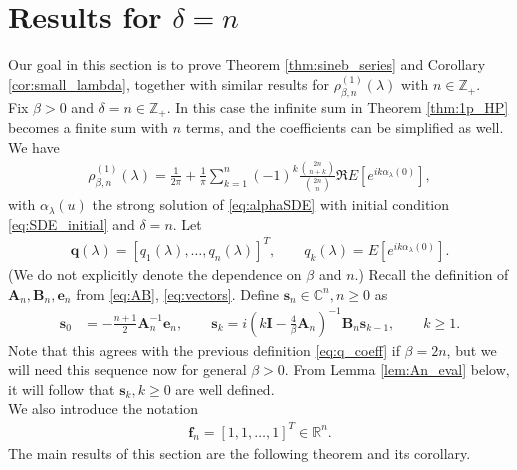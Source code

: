 \documentclass[12pt]{article}
\theoremstyle{definition} %
\newcommand{\Z}{{\mathbb Z}}
\newcommand{\R}{{\mathbb R}}
\newcommand{\CC}{{\mathbb C}}
\theoremstyle{remark} %
\begin{document}
\section{Results for $\delta=n$}\label{sec:delta_n}

Our goal in this section is to prove Theorem \ref{thm:sineb_series} and  Corollary \ref{cor:small_lambda}, together with  similar results for $\rho_{\beta,n}^{(1)}(\lambda)$ with $n\in \Z_+$.\\
Fix $\beta>0$ and $\delta=n\in \Z_+$. In this case the infinite sum in Theorem \ref{thm:1p_HP} becomes a finite sum with $n$ terms, and the coefficients can be simplified as well. We have 
\begin{align}\label{eq:rho_HP_n}
      \rho^{(1)}_{\beta,n}(\lambda)=\frac{1}{2\pi}+\frac{1}{\pi}\sum_{k=1}^n (-1)^k  \frac{\binom{2n}{n+k}}{\binom{2n}{n}} \Re E[e^{i k \alpha_\lambda(0)}], 
\end{align}
with $\alpha_\lambda(u)$ the strong solution of \eqref{eq:alphaSDE} with initial condition \eqref{eq:SDE_initial} and $\delta=n$. 
Let
 \begin{align}
    \mathbf{q}(\lambda)=[q_1(\lambda), \dots, q_n(\lambda)]^T, \qquad q_k(\lambda)=E[e^{i k\alpha_\lambda(0)}].
\end{align}   
(We do not explicitly denote the dependence on $\beta$ and $n$.)
Recall the definition of $\mathbf{A}_n, \mathbf{B}_n, \mathbf{e}_n$  from \eqref{eq:AB}, \eqref{eq:vectors}.
Define $\mathbf{s}_n\in \CC^n , n\ge 0$
as
\begin{align}\label{eq:q_coeff_1}
    \mathbf{s}_0&=-\frac{n+1}{2}\mathbf{A}_n^{-1}\mathbf{e}_n, \qquad \mathbf{s}_k=i \left(k \mathbf{I}-\tfrac{4}{\beta} \mathbf{A}_n\right)^{-1} \mathbf{B}_n \mathbf{s}_{k-1}, \qquad k\ge 1.
\end{align}
Note that this agrees with the previous definition \eqref{eq:q_coeff} if $\beta=2n$, but we will need this sequence now for general $\beta>0$. From Lemma \ref{lem:An_eval} below, it will follow that $\mathbf{s}_k, k\ge 0$ are well defined. \\
We also introduce the notation
\begin{align}\label{eq:f}
    \mathbf{f}_n=[1,1,\dots,1]^T\in \R^n.
\end{align}
The main results of this section are the following theorem and its corollary. 
\end{document}
